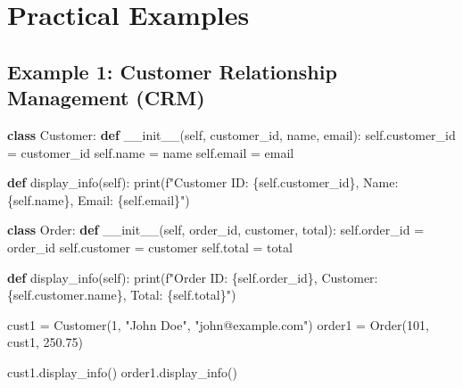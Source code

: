 \documentclass[
  letterpaper,
  DIV=11,
  numbers=noendperiod]{scrreprt}
\newenvironment{Shaded}{\begin{snugshade}}{\end{snugshade}}
\newcommand{\BuiltInTok}[1]{\textcolor[rgb]{0.00,0.23,0.31}{#1}}
\newcommand{\DecValTok}[1]{\textcolor[rgb]{0.68,0.00,0.00}{#1}}
\newcommand{\FloatTok}[1]{\textcolor[rgb]{0.68,0.00,0.00}{#1}}
\newcommand{\FunctionTok}[1]{\textcolor[rgb]{0.28,0.35,0.67}{#1}}
\newcommand{\KeywordTok}[1]{\textcolor[rgb]{0.00,0.23,0.31}{\textbf{#1}}}
\newcommand{\NormalTok}[1]{\textcolor[rgb]{0.00,0.23,0.31}{#1}}
\newcommand{\OperatorTok}[1]{\textcolor[rgb]{0.37,0.37,0.37}{#1}}
\newcommand{\SpecialCharTok}[1]{\textcolor[rgb]{0.37,0.37,0.37}{#1}}
\newcommand{\SpecialStringTok}[1]{\textcolor[rgb]{0.13,0.47,0.30}{#1}}
\newcommand{\StringTok}[1]{\textcolor[rgb]{0.13,0.47,0.30}{#1}}
\newcommand{\VariableTok}[1]{\textcolor[rgb]{0.07,0.07,0.07}{#1}}
\begin{document}
\section{Practical Examples}\label{practical-examples-2}

\subsection{Example 1: Customer Relationship Management
(CRM)}\label{example-1-customer-relationship-management-crm}

\begin{Shaded}
\begin{Highlighting}[]
\KeywordTok{class}\NormalTok{ Customer:}
    \KeywordTok{def} \FunctionTok{\_\_init\_\_}\NormalTok{(}\VariableTok{self}\NormalTok{, customer\_id, name, email):}
        \VariableTok{self}\NormalTok{.customer\_id }\OperatorTok{=}\NormalTok{ customer\_id}
        \VariableTok{self}\NormalTok{.name }\OperatorTok{=}\NormalTok{ name}
        \VariableTok{self}\NormalTok{.email }\OperatorTok{=}\NormalTok{ email}

    \KeywordTok{def}\NormalTok{ display\_info(}\VariableTok{self}\NormalTok{):}
        \BuiltInTok{print}\NormalTok{(}\SpecialStringTok{f"Customer ID: }\SpecialCharTok{\{}\VariableTok{self}\SpecialCharTok{.}\NormalTok{customer\_id}\SpecialCharTok{\}}\SpecialStringTok{, Name: }\SpecialCharTok{\{}\VariableTok{self}\SpecialCharTok{.}\NormalTok{name}\SpecialCharTok{\}}\SpecialStringTok{, Email: }\SpecialCharTok{\{}\VariableTok{self}\SpecialCharTok{.}\NormalTok{email}\SpecialCharTok{\}}\SpecialStringTok{"}\NormalTok{)}

\KeywordTok{class}\NormalTok{ Order:}
    \KeywordTok{def} \FunctionTok{\_\_init\_\_}\NormalTok{(}\VariableTok{self}\NormalTok{, order\_id, customer, total):}
        \VariableTok{self}\NormalTok{.order\_id }\OperatorTok{=}\NormalTok{ order\_id}
        \VariableTok{self}\NormalTok{.customer }\OperatorTok{=}\NormalTok{ customer}
        \VariableTok{self}\NormalTok{.total }\OperatorTok{=}\NormalTok{ total}

    \KeywordTok{def}\NormalTok{ display\_info(}\VariableTok{self}\NormalTok{):}
        \BuiltInTok{print}\NormalTok{(}\SpecialStringTok{f"Order ID: }\SpecialCharTok{\{}\VariableTok{self}\SpecialCharTok{.}\NormalTok{order\_id}\SpecialCharTok{\}}\SpecialStringTok{, Customer: }\SpecialCharTok{\{}\VariableTok{self}\SpecialCharTok{.}\NormalTok{customer}\SpecialCharTok{.}\NormalTok{name}\SpecialCharTok{\}}\SpecialStringTok{, Total: }\SpecialCharTok{\{}\VariableTok{self}\SpecialCharTok{.}\NormalTok{total}\SpecialCharTok{\}}\SpecialStringTok{"}\NormalTok{)}

\NormalTok{cust1 }\OperatorTok{=}\NormalTok{ Customer(}\DecValTok{1}\NormalTok{, }\StringTok{"John Doe"}\NormalTok{, }\StringTok{"john@example.com"}\NormalTok{)}
\NormalTok{order1 }\OperatorTok{=}\NormalTok{ Order(}\DecValTok{101}\NormalTok{, cust1, }\FloatTok{250.75}\NormalTok{)}

\NormalTok{cust1.display\_info()}
\NormalTok{order1.display\_info()}
\end{Highlighting}
\end{Shaded}
\end{document}
